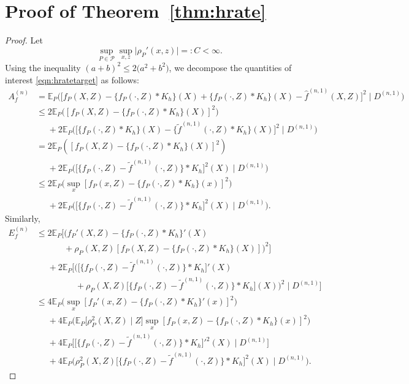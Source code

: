 \documentclass[aos]{imsart}
\newcommand{\E}{\mathbb{E}}
\begin{document}
	\section{Proof of Theorem~\ref{thm:hrate}}
	\begin{proof}
		Let \begin{equation*}
			\sup_{P\in \mathcal{P}} \sup_{x,z} \big| \rho_P'(x,z)\big| =:C < \infty.
		\end{equation*}
		Using the inequality $(a+b)^2\leq 2\big(a^2+b^2\big)$, we decompose the quantities of interest \eqref{eqn:hratetarget} as follows:
		\begin{align}
			A_f^{(n)} &= \E_P \Big(\big[f_P(X,Z)-\{f_P(\cdot,Z)*K_h\}(X) + \{f_P(\cdot,Z)*K_h\}(X) - \hat f^{(n,1)}(X,Z)\big]^2 \; \Big| \; D^{(n,1)}\Big)\nonumber\\
			&\leq 2 \E_P \big([f_P(X,Z)-\{f_P(\cdot,Z)*K_h\}(X)]^2\big)\nonumber\\
			&\phantom{\leq} + 2\E_P\Big(\big[\{f_P(\cdot,Z)*K_h\}(X) - \big\{\tilde f^{(n,1)}(\cdot,Z)*K_h\big\}(X)\big]^2 \; \Big| \; D^{(n,1)}\Big)\nonumber\\
			&= 2 \E_P ([f_P(X,Z)-\{f_P(\cdot,Z)*K_h\}(X)]^2)\nonumber\\
			&\phantom{\leq} + 2\E_P\Big(\big[\big\{f_P(\cdot,Z) - \tilde f^{(n,1)}(\cdot,Z)\big\}*K_h\big]^2(X)  \; \Big| \; D^{(n,1)}\Big)\nonumber\\
			&\leq 2 \E_P\Big(\sup_{x} [f_P(x,Z)-\{f_P(\cdot,Z)*K_h\}(x)]^2\Big)\nonumber\\
			&\phantom{\leq} + 2\E_P\Big(\big[\big\{f_P(\cdot,Z) - \tilde f^{(n,1)}(\cdot,Z)\big\}*K_h\big]^2(X)  \; \Big| \; D^{(n,1)}\Big). \label{eqn:Afbound}
		\end{align}
		Similarly,
		\begin{align}
			E_f^{(n)} &\leq 2 \E_P\Big[ \big( f_P'(X,Z)- \{f_P(\cdot,Z)*K_h\}'(X)\nonumber\\
			&\phantom{\leq 2 \E_P\Big[}+\rho_{P}(X,Z)[f_P(X,Z)-\{f_P(\cdot,Z)*K_h\}(X)]\big)^2\Big]\nonumber\\
			&\phantom{\leq} + 2 \E_P\bigg[ \Big(  \big[\big\{f_P(\cdot,Z) - \tilde f^{(n,1)}(\cdot,Z)\big\}*K_h\big]'(X)\nonumber\\
			&\phantom{\leq \leq 2 \E_P\bigg[}+\rho_{P}(X,Z) \big[\big\{f_P(\cdot,Z) - \tilde f^{(n,1)}(\cdot,Z)\big\}*K_h\big](X)\Big)^2 \; \bigg| \; D^{(n,1)}\bigg]\nonumber\\
			&\leq 4 \E_P\Big(\sup_{x} [ f_P'(x,Z)-\{f_P(\cdot,Z)*K_h\}'(x)]^2\Big)\nonumber\\
			&\phantom{\leq }+ 4\E_P\Big(\E_P\big[\rho^2_{P}(X,Z) \; \big| \; Z \big] \sup_{x} [f_P(x,Z)-\{f_P(\cdot,Z)*K_h\}(x)]^2\Big)\nonumber\\
			&\phantom{\leq} + 4 \E_P\bigg[ \big[\big\{f_P(\cdot,Z) - \tilde f^{(n,1)}(\cdot,Z)\big\}*K_h\big]'^2(X) \; \bigg| \; D^{(n,1)}\bigg]\nonumber\\
			&\phantom{\leq }+ 4 \E_P\Big(\rho^2_{P}(X,Z) \big[\big\{f_P(\cdot,Z) - \tilde f^{(n,1)}(\cdot,Z)\big\}*K_h\big]^2(X)\; \Big| \; D^{(n,1)}\Big).\label{eqn:Bfbound}
		\end{align}
		

\end{proof}
\end{document}

